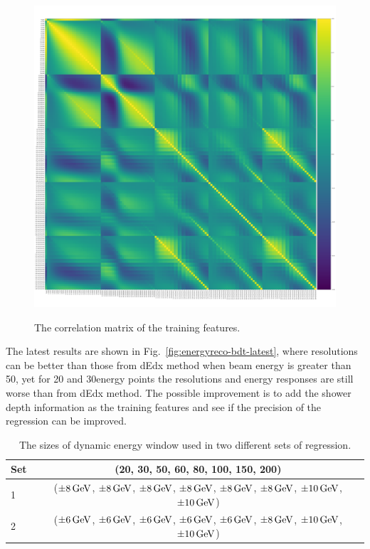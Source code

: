 \begin{figure}[p]
    \begin{center}  
    \includegraphics[width=1.0\textwidth]{Fig/fig_HGCAL/corr_matrix_showershape}\\
    \caption{The correlation matrix of the training features.}
    \label{fig:corr_matrix}
    \end{center}
\end{figure}


The latest results are shown in Fig.~\ref{fig:energyreco-bdt-latest}, where resolutions can be better than those from dEdx method when beam energy is greater than 50\GeV, yet for 20 and 30\GeV energy points the resolutions and energy responses are still worse than from dEdx method. The possible improvement is to add the shower depth information as the training features and see if the precision of the regression can be improved.

\begin{table}[!ht]
  \begin{center}
    {\small
    \begin{tabular}{lc}
    	Set &  (20, 30, 50, 60, 80, 100, 150, 200)\GeV \\
    	\hline
    	1 & ($\pm 8\,\text{Ge\hspace{-.08em}V}$, $\pm 8\,\text{Ge\hspace{-.08em}V}$, $\pm 8\,\text{Ge\hspace{-.08em}V}$, $\pm 8\,\text{Ge\hspace{-.08em}V}$, $\pm 8\,\text{Ge\hspace{-.08em}V}$, $\pm 8\,\text{Ge\hspace{-.08em}V}$, $\pm 10\,\text{Ge\hspace{-.08em}V}$, $\pm 10\,\text{Ge\hspace{-.08em}V}$) \\
    	2 & ($\pm 6\,\text{Ge\hspace{-.08em}V}$, $\pm 6\,\text{Ge\hspace{-.08em}V}$, $\pm 6\,\text{Ge\hspace{-.08em}V}$, $\pm 6\,\text{Ge\hspace{-.08em}V}$, $\pm 6\,\text{Ge\hspace{-.08em}V}$, $\pm 8\,\text{Ge\hspace{-.08em}V}$, $\pm 10\,\text{Ge\hspace{-.08em}V}$, $\pm 10\,\text{Ge\hspace{-.08em}V}$) \\
    \end{tabular}
    }
  \end{center}
  \caption{The sizes of dynamic energy window used in two different sets of regression.  \label{tab:EnergyWindowSize}}
\end{table}

